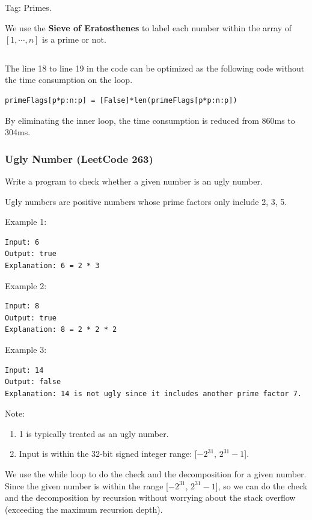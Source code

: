 \documentclass[11pt]{article}
\begin{document}
Tag: Primes.

We use the \textbf{Sieve of Eratosthenes} to label each number within the array of $[1, \cdots, n]$ is a prime or not.
\inputminted[breaklines=true,frame=leftline, linenos=true]{python}{src/countPrimes.py}

The line 18 to line 19 in the code can be optimized as the following code without the time consumption on the loop. 
\begin{verbatim}
primeFlags[p*p:n:p] = [False]*len(primeFlags[p*p:n:p])	
\end{verbatim}

By eliminating the inner loop, the time consumption is reduced from 860ms to 304ms. 

\subsubsection{Ugly Number (LeetCode 263)}
Write a program to check whether a given number is an ugly number.

Ugly numbers are positive numbers whose prime factors only include 2, 3, 5.

Example 1:
\begin{verbatim}
Input: 6
Output: true
Explanation: 6 = 2 * 3
\end{verbatim}

Example 2:
\begin{verbatim}
Input: 8
Output: true
Explanation: 8 = 2 * 2 * 2
\end{verbatim}

Example 3:
\begin{verbatim}
Input: 14
Output: false 
Explanation: 14 is not ugly since it includes another prime factor 7.
\end{verbatim}

Note:
\begin{enumerate}
	\item 1 is typically treated as an ugly number.
	\item Input is within the 32-bit signed integer range: [$-2^{31}$, $2^{31}-1$].
\end{enumerate}

We use the while loop to do the check and the decomposition for a given number. Since the given number is within the range [$-2^{31}$, $2^{31}-1$], so we can do the check and the decomposition by recursion without worrying about the stack overflow (exceeding the maximum recursion depth). 
\inputminted[breaklines=true,frame=leftline, linenos=true]{python}{src/isUgly.py}
\end{document}
